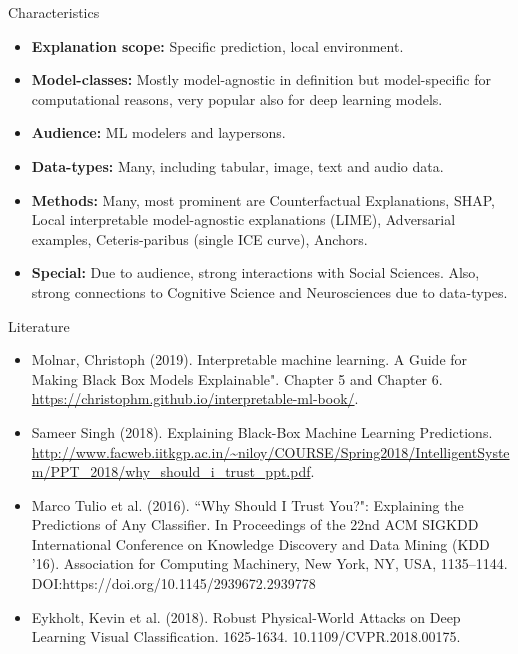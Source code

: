 \documentclass[11pt,compress,t,notes=noshow, xcolor=table]{beamer}
\begin{document}
\begin{vbframe}{Characteristics}
	\begin{itemize}
		\item \textbf{Explanation scope:} Specific prediction, local environment.
		\item \textbf{Model-classes:} Mostly model-agnostic in definition but model-specific for computational reasons, very popular also for deep learning models.
		\item \textbf{Audience:} ML modelers and laypersons.
		\item \textbf{Data-types:} Many, including tabular, image, text and audio data.
		\item \textbf{Methods:} Many, most prominent are Counterfactual Explanations, SHAP, Local interpretable model-agnostic explanations (LIME), Adversarial examples, Ceteris-paribus (single ICE curve), Anchors.
		\item \textbf{Special:} Due to audience, strong interactions with Social Sciences. Also, strong connections to Cognitive Science and Neurosciences due to data-types.
	\end{itemize}
\end{vbframe}

\begin{vbframe}{Literature}
	\begin{itemize}
		\small
		\item Molnar, Christoph (2019). Interpretable machine learning. A Guide for Making Black Box Models Explainable". Chapter 5 and Chapter 6. \url{https://christophm.github.io/interpretable-ml-book/}.
		\item Sameer Singh (2018). Explaining Black-Box Machine Learning Predictions.  \url{http://www.facweb.iitkgp.ac.in/~niloy/COURSE/Spring2018/IntelligentSystem/PPT_2018/why_should_i_trust_ppt.pdf}. 
		\item Marco Tulio et al. (2016). ``Why Should I Trust You?": Explaining the Predictions of Any Classifier. In Proceedings of the 22nd ACM SIGKDD International Conference on Knowledge Discovery and Data Mining (KDD '16). Association for Computing Machinery, New York, NY, USA, 1135–1144. DOI:https://doi.org/10.1145/2939672.2939778
		\item Eykholt, Kevin et al. (2018). Robust Physical-World Attacks on Deep Learning Visual Classification. 1625-1634. 10.1109/CVPR.2018.00175. 
	\end{itemize}
\end{vbframe}

\endlecture
\end{document}
